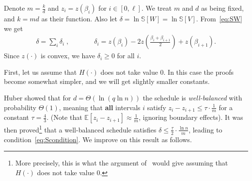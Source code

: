 \documentclass[final,12pt]{colt2018}
\def\myparagraph#1{\vspace{2pt}\noindent{\bf #1~~}}
\def\E{{\mathbb E}}
\def\Vrel(#1){{{\mathbb S}[{#1}]}}
\begin{document}
Denote $m=\frac{k}d$ and $z_i=z(\beta_i)$ for $i\in[0,\ell]$.
We treat $m$ and $d$ as being fixed, and $k=md$ as their function.
Also let  $\delta=\ln\Vrel(W)=\ln\Vrel(V)$. From~\eqref{eq:SW} we get
\begin{eqnarray}
\delta=\sum_i \delta_i\;, \mbox{~~~~~~~~~~~} \delta_i=z(\beta_{i}) - 2\mbox{$z\left(\frac{\beta_i+\beta_{i+1}}{2}\right)$} + z(\beta_{i+1}).
\end{eqnarray}
Since $z(\cdot)$ is convex, we have $\delta_i\ge 0$ for all $i$.

\myparagraph{\fbox{Case I: $H(x)\in[1,n]$ for all $x\in\Omega$}} First, let us assume that $H(\cdot)$ does not take value $0$.
In this case the proofs become somewhat simpler, and we will get slightly smaller constants.

Huber showed that for  $d=\Theta(\ln(q\ln n))$  
the schedule is {\em well-balanced} with probability $\Theta(1)$,
meaning that {\bf all} intervals $i$ satisfy $z_i-z_{i+1}\le \tau\cdot\frac{1}{m}$ for a constant $\tau=\frac{4}{3}$.
(Note that $\E[z_i-z_{i+1}]\approx\frac{1}m$, ignoring boundary effects).
It was then
% 
%
proved\footnote{More precisely, this is what the argument of~\cite{Huber:Gibbs} would give assuming that $H(\cdot)$ does not take value $0$.} 
%
that a well-balanced schedule satisfies $\delta\le \frac\tau 2 \cdot \frac{\ln n}{m}$,
leading to condition~\eqref{eq:Scondition}.
We improve on this result as follows.
\end{document}

